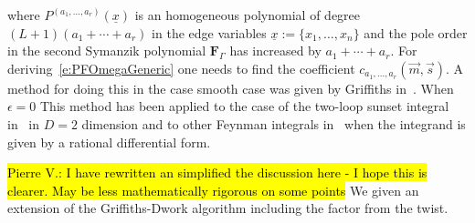 \documentclass[a4paper,12pt]{article}
\numberwithin{equation}{section}
\numberwithin{figure}{section}
\newcommand{\pvnote}[1]{\sethlcolor{bubblegum} \protect\hl{Pierre V.: #1} \sethlcolor{yellow}}
\begin{document}
where 
$  P^{(a_1,\dots,a_r)}(\underline x)$ is an
  homogeneous polynomial of degree $(L+1)(a_1+\cdots+a_r)$ in
 the edge variables $\underline x:=\{x_1,\dots, x_n\}$ and the
  pole order in the second Symanzik polynomial $\textbf{F}_\Gamma$ has increased by
  $a_1+\cdots+a_r$. 
  For deriving~\eqref{e:PFOmegaGeneric} one needs to find the
  coefficient $c_{a_1,\dots,a_r}(\vec m,\vec s)$.  A method for doing this in the
  case smooth case was given by Griffiths in~\cite{Griffiths_1969,Dwork_1962,Dwork_1964}.
When $\epsilon=0$ 
This method has been applied to the case of the two-loop sunset
integral in~\cite{Bloch:2016izu} in $D=2$ dimension and to other Feynman
integrals in~\cite{Lairez:2022zkj}  when the integrand is given by a rational
differential form.

\label{sec:Red}
\pvnote{I have rewritten an simplified the discussion here - I hope
  this is clearer. May be less mathematically rigorous on some points}
We given an extension of  the Griffiths-Dwork algorithm including the
factor from the twist.
\end{document}
